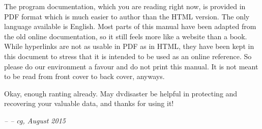 The program documentation, which you are reading
right now, is provided in PDF format which is much
easier to author than the HTML version. The only
language available is English. Most parts of this
manual have been adapted from the old online
documentation, so it still feels more like a website
than a book. While hyperlinks are not as usable in PDF
as in HTML, they have been kept in this document to
stress that it is intended to be used as an online reference.
So please do our environment a favour and do not print
this manual. It is not meant to be read
from front cover to back cover, anyways.

\smallskip

Okay, enough ranting already. May dvdisaster be helpful
in protecting and recovering your valuable data,
and thanks for using it!

\bigskip

{\em -- -- cg, August 2015}


